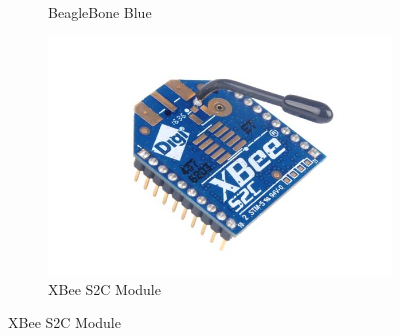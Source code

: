 \begin{figure}
\begin{subfigure}[t]{0.32\linewidth}
    \captionsetup{width=\linewidth}
    \caption{BeagleBone Blue}
    \label{fig:beagleboneBlue}
  \end{subfigure}
  \begin{subfigure}[t]{0.32\linewidth}
    \includegraphics[width=1\linewidth]{figs/img/Xbee-S2C-Module}
    \captionsetup{width=\linewidth}
    \caption{XBee S2C Module}
    \label{fig:XBeeModule}
  \end{subfigure}
\end{figure}

